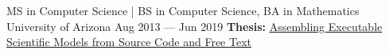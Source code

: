 
\vspace{-0.25cm}
\begin{cventries}
  \cventry
    {MS in Computer Science | BS in Computer Science, BA in Mathematics} %
    {University of Arizona} %
    {Aug 2013 --- Jun 2019} %
    {} %
    {
      \vspace{-0.15cm}
      \textbf{Thesis:} \href{https://repository.arizona.edu/handle/10150/634301}{\underline{Assembling Executable Scientific Models from Source Code and Free Text}}
    }


\end{cventries}
